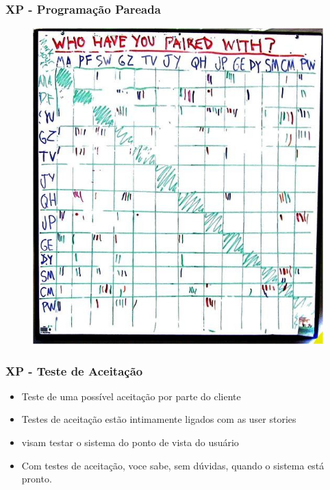\begin{frame}	
 \frametitle{XP - Programação Pareada}
  \begin{figure}
   \centering
   \includegraphics[width = \textwidth]{figs/pairing.png}
  \end{figure}
\end{frame}

\begin{frame}
 \frametitle{XP - Teste de Aceitação}
 \begin{itemize}
  \item  Teste de uma possível aceitação por parte do cliente
  \item Testes de aceitação estão intimamente ligados com as user stories
  \item  visam testar o sistema do ponto de vista do usuário
  \item Com testes de aceitação, voce sabe, sem dúvidas, quando o sistema está pronto.
 \end{itemize}
\end{frame}


